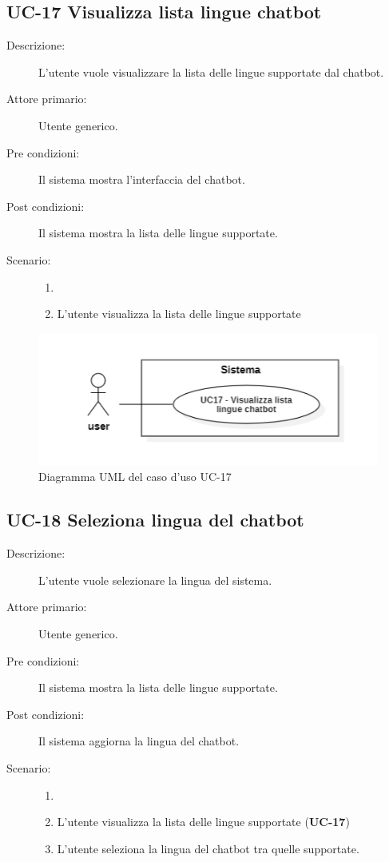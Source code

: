 \subsection{UC-17 Visualizza lista lingue chatbot}
\begin{description}
    \item[Descrizione:] L'utente vuole visualizzare la lista delle lingue supportate dal chatbot.
    \item[Attore primario:] Utente generico.
    \item[Pre condizioni:] Il sistema mostra l'interfaccia del chatbot.
    \item[Post condizioni:] Il sistema mostra la lista delle lingue supportate.
    \item[Scenario:]
    \begin{enumerate}
        \item[]
        \item L'utente visualizza la lista delle lingue supportate
    \end{enumerate}
\end{description}

\begin{figure}[H]
    \centering
    \includegraphics[width=0.8\linewidth]{UC17.PNG}
    \caption{Diagramma UML del caso d'uso UC-17}
\end{figure}

\subsection{UC-18 Seleziona lingua del chatbot}
\begin{description}
    \item[Descrizione:] L'utente vuole selezionare la lingua del sistema.
    \item[Attore primario:] Utente generico.
    \item[Pre condizioni:] Il sistema mostra la lista delle lingue supportate.
    \item[Post condizioni:] Il sistema aggiorna la lingua del chatbot.
    \item[Scenario:]
    \begin{enumerate}
        \item[]
        \item L'utente visualizza la lista delle lingue supportate (\textbf{UC-17})
        \item L’utente seleziona la lingua del chatbot tra quelle supportate.
    \end{enumerate}
\end{description}

